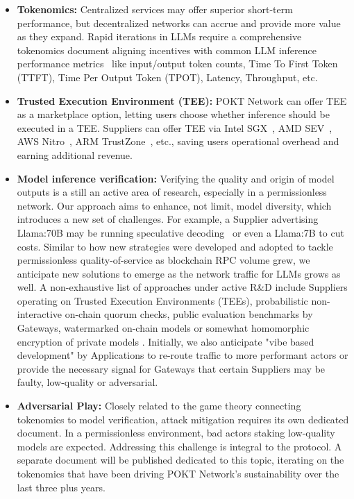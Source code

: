 \documentclass[conference,compsoc]{IEEEtran}
\begin{document}
\begin{itemize}
    \item \textbf{Tokenomics:} Centralized services may offer superior short-term performance, but decentralized networks can accrue and provide more value as they expand. Rapid iterations in LLMs require a comprehensive tokenomics document aligning incentives with common LLM inference performance metrics~\cite{databricksInferencePerformance} like input/output token counts, Time To First Token (TTFT), Time Per Output Token (TPOT), Latency, Throughput, etc.

    \item \textbf{Trusted Execution Environment (TEE):} POKT Network can offer TEE as a marketplace option, letting users choose whether inference should be executed in a TEE. Suppliers can offer TEE via Intel SGX~\cite{intelIntelSoftware}, AMD SEV~\cite{amdsev}, AWS Nitro~\cite{amazonLightweightHypervisor}, ARM TrustZone~\cite{armTrustZoneCortexA}, etc., saving users operational overhead and earning additional revenue.

    \item \textbf{Model inference verification:} Verifying the quality and origin of model outputs is a still an active area of research, especially in a permissionless network. Our approach aims to enhance, not limit, model diversity, which introduces a new set of challenges. For example, a Supplier advertising Llama:70B may be running speculative decoding~\cite{leviathan2023fast} or even a Llama:7B to cut costs. Similar to how new strategies were developed and adopted to tackle permissionless quality-of-service as blockchain RPC volume grew, we anticipate new solutions to emerge as the network traffic for LLMs grows as well. A non-exhaustive list of approaches under active R\&D include Suppliers operating on Trusted Execution Environments (TEEs), probabilistic non-interactive on-chain quorum checks, public evaluation benchmarks by Gateways, watermarked on-chain models \cite{watermarking} or somewhat homomorphic encryption of private models \cite{cryptoeprint:2013/422}. Initially, we also anticipate "vibe based development" by Applications \cite{simonWillisonVibes} to re-route traffic to more performant actors or provide the necessary signal for Gateways that certain Suppliers may be faulty, low-quality or adversarial.
    
    \item \textbf{Adversarial Play:} Closely related to the game theory connecting tokenomics to model verification, attack mitigation requires its own dedicated document. In a permissionless environment, bad actors staking low-quality models are expected. Addressing this challenge is integral to the protocol. A separate document will be published dedicated to this topic, iterating on the tokenomics that have been driving POKT Network's sustainability over the last three plus years.


\end{itemize}
\end{document}
